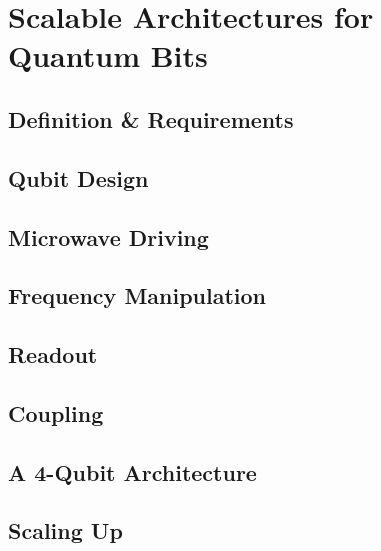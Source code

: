 \chapter{Scalable Architectures for Quantum Bits}

\section{Definition \& Requirements}

\section{Qubit Design}

\section{Microwave Driving}

\section{Frequency Manipulation}

\section{Readout}

\section{Coupling}



\section{A 4-Qubit Architecture}


\section{Scaling Up}


